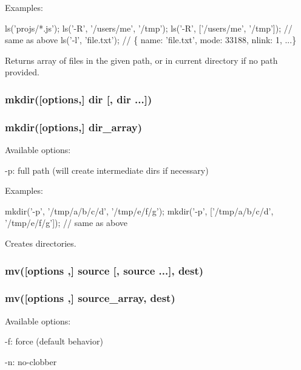 Examples\+:


\begin{DoxyCode}
ls('projs/*.js');
ls('-R', '/users/me', '/tmp');
ls('-R', ['/users/me', '/tmp']); // same as above
ls('-l', 'file.txt'); // \{ name: 'file.txt', mode: 33188, nlink: 1, ...\}
\end{DoxyCode}


Returns array of files in the given path, or in current directory if no path provided.

\subsubsection*{mkdir(\mbox{[}options,\mbox{]} dir \mbox{[}, dir ...\mbox{]})}

\subsubsection*{mkdir(\mbox{[}options,\mbox{]} dir\+\_\+array)}

Available options\+:


\begin{DoxyItemize}
\item {\ttfamily -\/p}\+: full path (will create intermediate dirs if necessary)
\end{DoxyItemize}

Examples\+:


\begin{DoxyCode}
mkdir('-p', '/tmp/a/b/c/d', '/tmp/e/f/g');
mkdir('-p', ['/tmp/a/b/c/d', '/tmp/e/f/g']); // same as above
\end{DoxyCode}


Creates directories.

\subsubsection*{mv(\mbox{[}options ,\mbox{]} source \mbox{[}, source ...\mbox{]}, dest\textquotesingle{})}

\subsubsection*{mv(\mbox{[}options ,\mbox{]} source\+\_\+array, dest\textquotesingle{})}

Available options\+:


\begin{DoxyItemize}
\item {\ttfamily -\/f}\+: force (default behavior)
\item {\ttfamily -\/n}\+: no-\/clobber
\end{DoxyItemize}

